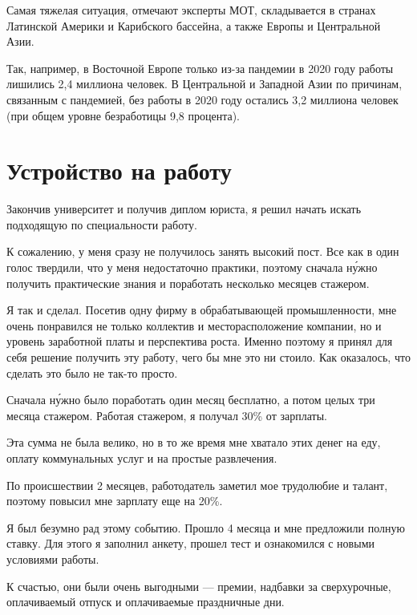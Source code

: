 Самая тяжелая ситуация, отмечают эксперты МОТ, складывается в странах Латинской Америки и Карибского бассейна, а также Европы и Центральной Азии.

Так, например, в Восточной Европе только из-за пандемии в 2020 году работы лишились 2,4 миллиона человек. В Центральной и Западной Азии по причинам, связанным с пандемией, без работы в 2020 году остались 3,2 миллиона человек (при общем уровне безработицы 9,8 процента).


\clearpage


\section{Устройство на работу}
Закончив университет и получив диплом юриста, я решил начать искать подходящую по специальности работу.

К сожалению, у меня сразу не получилось занять высокий пост.
Все как в один голос твердили, что у меня недостаточно практики, поэтому сначала н\'{у}жно получить практические знания и поработать несколько месяцев стажером.

Я так и сделал.
Посетив одну фирму в обрабатывающей промышленности, мне очень понравился не только коллектив и месторасположение компании, но и уровень заработной платы и перспектива роста.
Именно поэтому я принял для себя решение получить эту работу, чего бы мне это ни стоило.
Как оказалось, что сделать это было не так-то просто.

Сначала н\'{у}жно было поработать один месяц бесплатно, а потом целых три месяца стажером.
Работая стажером, я получал 30\% от зарплаты.

Эта сумма не была велико, но в то же время мне хватало этих денег на еду, оплату коммунальных услуг и на простые развлечения.

По происшествии 2 месяцев, работодатель заметил мое трудолюбие и талант, поэтому повысил мне зарплату еще на 20\%.

Я был безумно рад этому событию. Прошло 4 месяца и мне предложили полную ставку.
Для этого я заполнил анкету, прошел тест и ознакомился с новыми условиями работы.

К счастью, они были очень выгодными --- премии, надбавки за сверхурочные, оплачиваемый отпуск и оплачиваемые праздничные дни.

